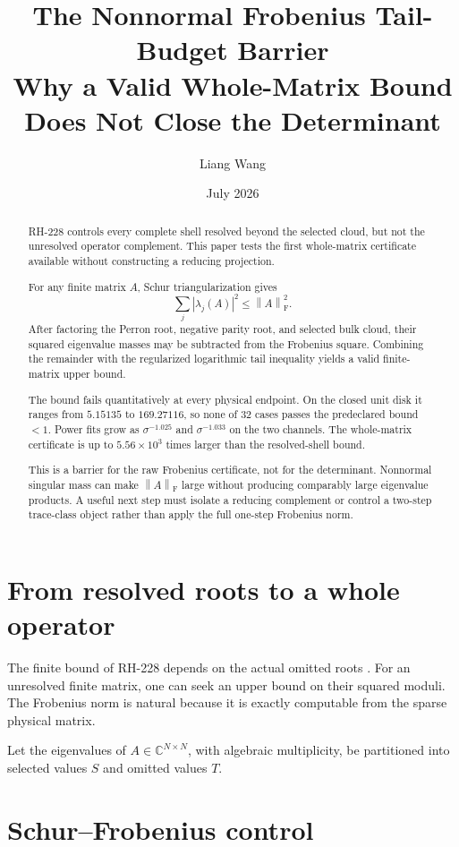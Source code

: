 \documentclass[11pt]{article}
\title{The Nonnormal Frobenius Tail-Budget Barrier\\
\large Why a Valid Whole-Matrix Bound Does Not Close the Determinant}
\author{Liang Wang}
\date{July 2026}
\theoremstyle{remark}\newtheorem{remark}[theorem]{Remark}
\newcommand{\norm}[1]{\left\lVert#1\right\rVert}
\begin{document}
\maketitle

\begin{abstract}
RH-228 controls every complete shell resolved beyond the selected cloud, but
not the unresolved operator complement. This paper tests the first
whole-matrix certificate available without constructing a reducing
projection.

For any finite matrix $A$, Schur triangularization gives
\[
 \sum_j|\lambda_j(A)|^2\le\norm{A}_{\mathrm F}^2.
\]
After factoring the Perron root, negative parity root, and selected bulk
cloud, their squared eigenvalue masses may be subtracted from the Frobenius
square. Combining the remainder with the regularized logarithmic tail
inequality yields a valid finite-matrix upper bound.

The bound fails quantitatively at every physical endpoint. On the closed unit
disk it ranges from $5.15135$ to $169.27116$, so none of 32 cases passes the
predeclared bound $<1$. Power fits grow as $\sigma^{-1.025}$ and
$\sigma^{-1.033}$ on the two channels. The whole-matrix certificate is up to
$5.56\times10^3$ times larger than the resolved-shell bound.

This is a barrier for the raw Frobenius certificate, not for the determinant.
Nonnormal singular mass can make $\norm A_{\mathrm F}$ large without producing
comparably large eigenvalue products. A useful next step must isolate a
reducing complement or control a two-step trace-class object rather than
apply the full one-step Frobenius norm.
\end{abstract}

\section{From resolved roots to a whole operator}

The finite bound of RH-228 depends on the actual omitted roots
\citep{WangRH228}. For an unresolved finite matrix, one can seek an upper
bound on their squared moduli. The Frobenius norm is natural because it is
exactly computable from the sparse physical matrix.

Let the eigenvalues of $A\in\mathbb C^{N\times N}$, with algebraic
multiplicity, be partitioned into selected values $S$ and omitted values $T$.

\section{Schur--Frobenius control}
\end{document}
